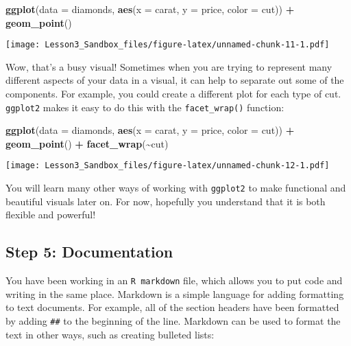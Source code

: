\documentclass[
]{article}
\newenvironment{Shaded}{\begin{snugshade}}{\end{snugshade}}
\newcommand{\AttributeTok}[1]{\textcolor[rgb]{0.13,0.29,0.53}{#1}}
\newcommand{\FunctionTok}[1]{\textcolor[rgb]{0.13,0.29,0.53}{\textbf{#1}}}
\newcommand{\NormalTok}[1]{#1}
\newcommand{\SpecialCharTok}[1]{\textcolor[rgb]{0.81,0.36,0.00}{\textbf{#1}}}
\begin{document}
\begin{Shaded}
\begin{Highlighting}[]
\FunctionTok{ggplot}\NormalTok{(}\AttributeTok{data =}\NormalTok{ diamonds, }\FunctionTok{aes}\NormalTok{(}\AttributeTok{x =}\NormalTok{ carat, }\AttributeTok{y =}\NormalTok{ price, }\AttributeTok{color =}\NormalTok{ cut)) }\SpecialCharTok{+}
  \FunctionTok{geom\_point}\NormalTok{()}
\end{Highlighting}
\end{Shaded}

\texttt{[image: Lesson3\_Sandbox\_files/figure-latex/unnamed-chunk-11-1.pdf]}

Wow, that's a busy visual! Sometimes when you are trying to represent
many different aspects of your data in a visual, it can help to separate
out some of the components. For example, you could create a different
plot for each type of cut. \texttt{ggplot2} makes it easy to do this
with the \texttt{facet\_wrap()} function:

\begin{Shaded}
\begin{Highlighting}[]
\FunctionTok{ggplot}\NormalTok{(}\AttributeTok{data =}\NormalTok{ diamonds, }\FunctionTok{aes}\NormalTok{(}\AttributeTok{x =}\NormalTok{ carat, }\AttributeTok{y =}\NormalTok{ price, }\AttributeTok{color =}\NormalTok{ cut)) }\SpecialCharTok{+}
  \FunctionTok{geom\_point}\NormalTok{() }\SpecialCharTok{+}
  \FunctionTok{facet\_wrap}\NormalTok{(}\SpecialCharTok{\textasciitilde{}}\NormalTok{cut)}
\end{Highlighting}
\end{Shaded}

\texttt{[image: Lesson3\_Sandbox\_files/figure-latex/unnamed-chunk-12-1.pdf]}

You will learn many other ways of working with \texttt{ggplot2} to make
functional and beautiful visuals later on. For now, hopefully you
understand that it is both flexible and powerful!

\hypertarget{step-5-documentation}{%
\subsection{Step 5: Documentation}\label{step-5-documentation}}

You have been working in an \texttt{R\ markdown} file, which allows you
to put code and writing in the same place. Markdown is a simple language
for adding formatting to text documents. For example, all of the section
headers have been formatted by adding \texttt{\#\#} to the beginning of
the line. Markdown can be used to format the text in other ways, such as
creating bulleted lists:
\end{document}
